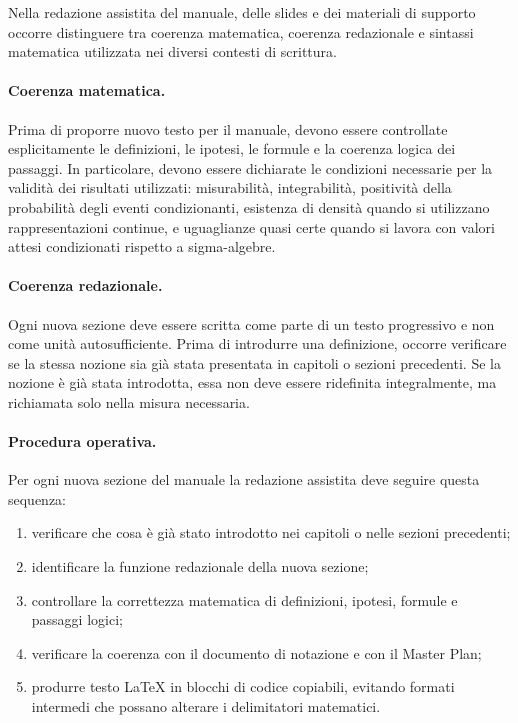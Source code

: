 \documentclass[12pt,a4paper]{article}%
\newcommand{\1}{\mathbf{1}}
\begin{document}
Nella redazione assistita del manuale, delle slides e dei materiali di
supporto occorre distinguere tra coerenza matematica, coerenza redazionale e
sintassi matematica utilizzata nei diversi contesti di scrittura.

\paragraph{Coerenza matematica.}

Prima di proporre nuovo testo per il manuale, devono essere controllate
esplicitamente le definizioni, le ipotesi, le formule e la coerenza logica dei
passaggi. In particolare, devono essere dichiarate le condizioni necessarie
per la validit\`{a} dei risultati utilizzati: misurabilit\`{a},
integrabilit\`{a}, positivit\`{a} della probabilit\`{a} degli eventi
condizionanti, esistenza di densit\`{a} quando si utilizzano rappresentazioni
continue, e uguaglianze quasi certe quando si lavora con valori attesi
condizionati rispetto a sigma-algebre.

\paragraph{Coerenza redazionale.}

Ogni nuova sezione deve essere scritta come parte di un testo progressivo e
non come unit\`{a} autosufficiente. Prima di introdurre una definizione,
occorre verificare se la stessa nozione sia gi\`{a} stata presentata in
capitoli o sezioni precedenti. Se la nozione \`{e} gi\`{a} stata introdotta,
essa non deve essere ridefinita integralmente, ma richiamata solo nella misura necessaria.

\paragraph{Procedura operativa.}

Per ogni nuova sezione del manuale la redazione assistita deve seguire questa sequenza:

\begin{enumerate}
\item verificare che cosa \`{e} gi\`{a} stato introdotto nei capitoli o nelle
sezioni precedenti;

\item identificare la funzione redazionale della nuova sezione;

\item controllare la correttezza matematica di definizioni, ipotesi, formule e
passaggi logici;

\item verificare la coerenza con il documento di notazione e con il Master Plan;

\item produrre testo LaTeX in blocchi di codice copiabili, evitando formati
intermedi che possano alterare i delimitatori matematici.
\end{enumerate}
\end{document}
